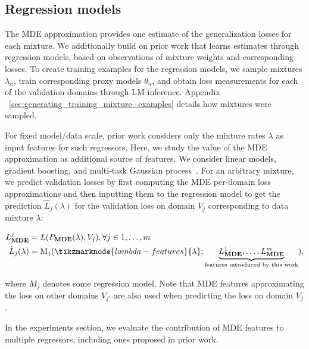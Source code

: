 \subsection{Regression models}


The MDE approximation provides one estimate of the generalization losses for each mixture. We additionally build on prior work that learns estimates through regression models, based on observations of mixture weights and corresponding losses. To create training examples for the regression models, we sample mixtures $\lambda_n$, train corresponding proxy models $\theta_n$, and obtain loss measurements for each of the validation domains through LM inference. Appendix ~\ref{sec:generating_training_mixture_examples} details how mixtures were sampled.

For fixed model/data scale, prior work considers only the mixture rates $\lambda$ as input features for such regressors. Here, we study the value of the MDE approximation as additional source of features. We consider linear models, gradient boosting, and multi-task Gaussian process~\citep[MTGP;][]{mtgp}. For an arbitrary mixture, we predict validation losses by first computing the MDE per-domain loss approximations and then inputting them to the regression model to get the prediction $\hat{L}_j(\lambda)$ for the validation loss on domain $V_j$ corresponding to data mixture $\lambda$:


\vspace{-10pt}
\begin{align*}
L_\mathbf{MDE}^j &= L(P_{\mathbf{MDE}}(\lambda),V_j), \forall j \in {1,\ldots,m} \\
\hat{L}_j(\lambda) &= \text{M}_j(\tikzmarknode{lambda-features}{\lambda}; \underbrace{L_\mathbf{MDE}^1,\ldots,L_\mathbf{MDE}^m}_{\text{\scriptsize features introduced by this work}}), 
\end{align*}

%
\vspace{-3pt}
where $M_j$ denotes some regression model. Note that MDE features approximating the loss on other domains $V_{j'}$ are also used when predicting the loss on domain $V_j$. 


In the experiments section, we evaluate the contribution of MDE features to multiple regressors, including ones proposed in prior work. 

